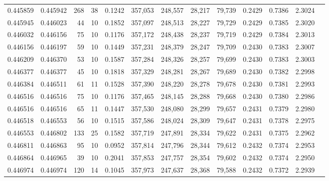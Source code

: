 \begin{tabular}{rrrrrrrrrrrrr}
0.445859 & 0.445942 &   268 &  38 &                                     0.1242 & 357,053 & 248,557 &  28,217 &  79,739 & 0.2429 & 0.7386 & 2.3024 \\
0.445945 & 0.446023 &    44 &  10 &                                     0.1852 & 357,097 & 248,513 &  28,227 &  79,729 & 0.2429 & 0.7385 & 2.3020 \\
0.446032 & 0.446156 &    75 &  10 &                                     0.1176 & 357,172 & 248,438 &  28,237 &  79,719 & 0.2429 & 0.7384 & 2.3013 \\
0.446156 & 0.446197 &    59 &  10 &                                     0.1449 & 357,231 & 248,379 &  28,247 &  79,709 & 0.2430 & 0.7383 & 2.3007 \\
0.446209 & 0.446370 &    53 &  10 &                                     0.1587 & 357,284 & 248,326 &  28,257 &  79,699 & 0.2430 & 0.7383 & 2.3003 \\
0.446377 & 0.446377 &    45 &  10 &                                     0.1818 & 357,329 & 248,281 &  28,267 &  79,689 & 0.2430 & 0.7382 & 2.2998 \\
0.446384 & 0.446511 &    61 &  11 &                                     0.1528 & 357,390 & 248,220 &  28,278 &  79,678 & 0.2430 & 0.7381 & 2.2993 \\
0.446516 & 0.446516 &    75 &  10 &                                     0.1176 & 357,465 & 248,145 &  28,288 &  79,668 & 0.2430 & 0.7380 & 2.2986 \\
0.446516 & 0.446516 &    65 &  11 &                                     0.1447 & 357,530 & 248,080 &  28,299 &  79,657 & 0.2431 & 0.7379 & 2.2980 \\
0.446518 & 0.446553 &    56 &  10 &                                     0.1515 & 357,586 & 248,024 &  28,309 &  79,647 & 0.2431 & 0.7378 & 2.2975 \\
0.446553 & 0.446802 &   133 &  25 &                                     0.1582 & 357,719 & 247,891 &  28,334 &  79,622 & 0.2431 & 0.7375 & 2.2962 \\
0.446811 & 0.446863 &    95 &  10 &                                     0.0952 & 357,814 & 247,796 &  28,344 &  79,612 & 0.2432 & 0.7374 & 2.2953 \\
0.446864 & 0.446965 &    39 &  10 &                                     0.2041 & 357,853 & 247,757 &  28,354 &  79,602 & 0.2432 & 0.7374 & 2.2950 \\
0.446974 & 0.446974 &   120 &  14 &                                     0.1045 & 357,973 & 247,637 &  28,368 &  79,588 & 0.2432 & 0.7372 & 2.2939 \\

\end{tabular}
